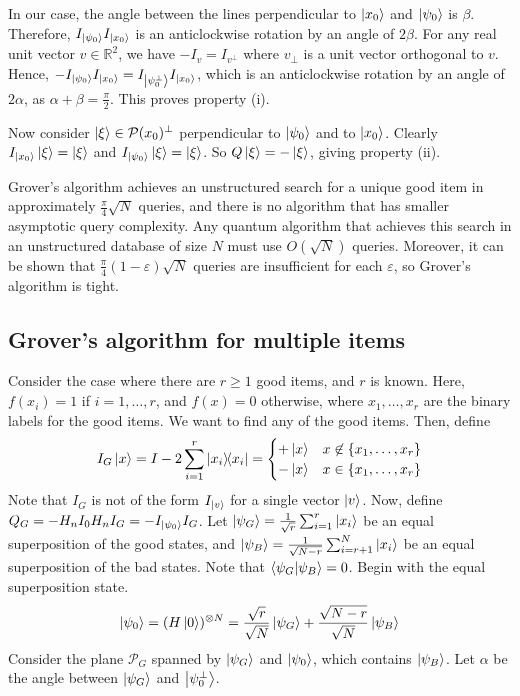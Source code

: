 In our case, the angle between the lines perpendicular to \( \ket{x_0} \) and \( \ket{\psi_0} \) is \( \beta \).
Therefore, \( I_{\ket{\psi_0}} I_{\ket{x_0}} \) is an anticlockwise rotation by an angle of \( 2\beta \).
For any real unit vector \( v \in \mathbb R^2 \), we have \( -I_v = I_{v^\perp} \) where \( v_\perp \) is a unit vector orthogonal to \( v \).
Hence, \( -I_{\ket{\psi_0}} I_{\ket{x_0}} = I_{\ket{\psi_0^\perp}} I_{\ket{x_0}} \), which is an anticlockwise rotation by an angle of \( 2\alpha \), as \( \alpha + \beta = \frac{\pi}{2} \).
This proves property (i).

Now consider \( \ket{\xi} \in \mathcal P(x_0)^\perp \) perpendicular to \( \ket{\psi_0} \) and to \( \ket{x_0} \).
Clearly \( I_{\ket{x_0}} \ket{\xi} = \ket{\xi} \) and \( I_{\ket{\psi_0}} \ket{\xi} = \ket{\xi} \).
So \( Q \ket{\xi} = -\ket{\xi} \), giving property (ii).

Grover's algorithm achieves an unstructured search for a unique good item in approximately \( \frac{\pi}{4}\sqrt{N} \) queries, and there is no algorithm that has smaller asymptotic query complexity.
Any quantum algorithm that achieves this search in an unstructured database of size \( N \) must use \( O(\sqrt{N}) \) queries.
Moreover, it can be shown that \( \frac{\pi}{4} (1 - \varepsilon) \sqrt{N} \) queries are insufficient for each \( \varepsilon \), so Grover's algorithm is tight.

\subsection{Grover's algorithm for multiple items}
Consider the case where there are \( r \geq 1 \) good items, and \( r \) is known.
Here, \( f(x_i) = 1 \) if \( i = 1, \dots, r \), and \( f(x) = 0 \) otherwise, where \( x_1, \dots, x_r \) are the binary labels for the good items.
We want to find any of the good items.
Then, define
\[ I_G \ket{x} = I - 2\sum_{i=1}^r \op{x_i}{x_i} = \begin{cases}
    +\ket{x} & x \not\in \qty{x_1, \dots, x_r} \\
    -\ket{x} & x \in \qty{x_1, \dots, x_r}
\end{cases} \]
Note that \( I_G \) is not of the form \( I_{\ket{v}} \) for a single vector \( \ket{v} \).
Now, define \( Q_G = -H_n I_0 H_n I_G = -I_{\ket{\psi_0}} I_G \).
Let \( \ket{\psi_G} = \frac{1}{\sqrt{r}} \sum_{i=1}^r \ket{x_i} \) be an equal superposition of the good states, and \( \ket{\psi_B} = \frac{1}{\sqrt{N-r}} \sum_{i=r+1}^N \ket{x_i} \) be an equal superposition of the bad states.
Note that \( \ip{\psi_G}{\psi_B} = 0 \).
Begin with the equal superposition state.
\[ \ket{\psi_0} = (H\ket{0})^{\otimes N} = \frac{\sqrt{r}}{\sqrt{N}} \ket{\psi_G} + \frac{\sqrt{N-r}}{\sqrt{N}} \ket{\psi_B} \]
Consider the plane \( \mathcal P_G \) spanned by \( \ket{\psi_G} \) and \( \ket{\psi_0} \), which contains \( \ket{\psi_B} \).
Let \( \alpha \) be the angle between \( \ket{\psi_G} \) and \( \ket{\psi_0^\perp} \).

